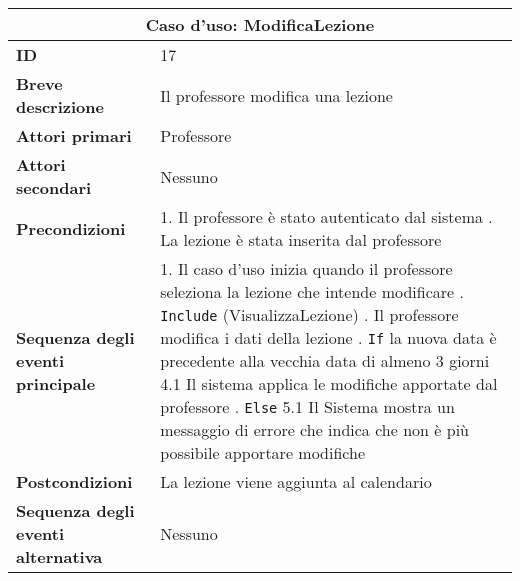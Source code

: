 \documentclass[11pt,a4paper]{report}
\begin{document}
\begin{table}[h!]
\centering
\renewcommand{\arraystretch}{1.3}
\begin{tabular}{|p{4.2cm}|p{10.2cm}|}
\hline
\multicolumn{2}{|c|}{\textbf{Caso d’uso:  ModificaLezione}} \\ \hline
\textbf{ID} & 17 \\ \hline
\textbf{Breve descrizione} & Il professore modifica una lezione \\ \hline
\textbf{Attori primari} & Professore \\ \hline
\textbf{Attori secondari} & Nessuno \\ \hline
\textbf{Precondizioni} &
1. Il professore è stato autenticato dal sistema \newline
2. La lezione è stata inserita dal professore \\ \hline
\textbf{Sequenza degli eventi principale} &
1. Il caso d’uso inizia quando il professore seleziona la lezione che intende modificare \newline
2. \texttt{Include} (VisualizzaLezione) \newline
3. Il professore modifica i dati della lezione \newline
4. \texttt{If} la nuova data è precedente alla vecchia data di almeno 3 giorni \newline
\hspace*{0.5cm} 4.1 Il sistema applica le modifiche apportate dal professore \newline
5. \texttt{Else} \newline
\hspace*{0.5cm} 5.1 Il Sistema mostra un messaggio di errore che indica che non è più possibile apportare modifiche \\ \hline
\textbf{Postcondizioni} & La lezione viene aggiunta al calendario \\ \hline
\textbf{Sequenza degli eventi alternativa} & Nessuno \\ \hline
\end{tabular}
\end{table}

\end{document}
